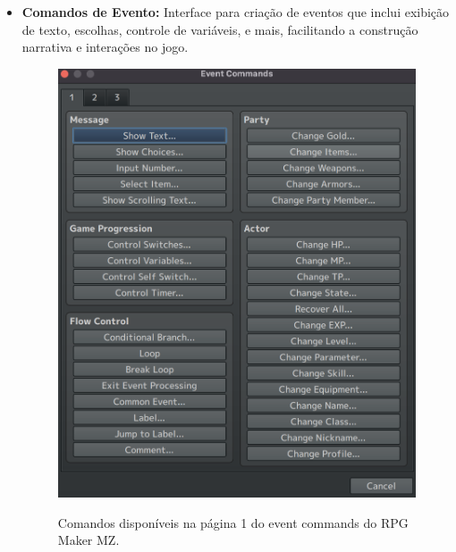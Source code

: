 \begin{itemize}
	\item \textbf{Comandos de Evento:} Interface para criação de eventos que inclui exibição de texto, escolhas, controle de variáveis, e mais, facilitando a construção narrativa e interações no jogo.

	      \begin{figure}[ht]
		      \centering
		      \caption{Comandos disponíveis na página 1 do event commands do RPG Maker MZ.}
		      \includegraphics[scale=0.3]{Textuais/Pictures/Event-commands-1.png}
		      \label{fig:rpgmaker-event-commands-1}
	      \end{figure}


\end{itemize}
